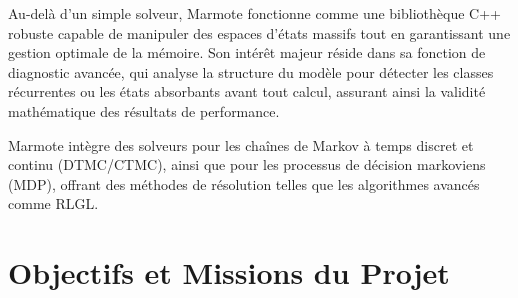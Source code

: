 \documentclass[14pt, a4paper]{extarticle}
\begin{document}
Au-delà d'un simple solveur, Marmote fonctionne comme une bibliothèque C++ robuste capable de manipuler des espaces d'états massifs tout en garantissant une gestion optimale de la mémoire. Son intérêt majeur réside dans sa fonction de diagnostic avancée, qui analyse la structure du modèle pour détecter les classes récurrentes ou les états absorbants avant tout calcul, assurant ainsi la validité mathématique des résultats de performance.

Marmote intègre des solveurs pour les chaînes de Markov à temps discret et continu (DTMC/CTMC), ainsi que pour les processus de décision markoviens (MDP), offrant des méthodes de résolution telles que les algorithmes avancés comme RLGL.

\section{Objectifs et Missions du Projet}
\end{document}
